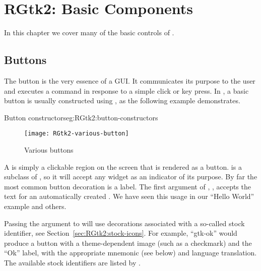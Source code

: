 \chapter{RGtk2: Basic Components}
\label{sec:basic-components}
In this chapter we cover many of the basic controls of \GTK.

\section{Buttons}
\label{sec:RGtk2:gtkButton}

The button is the very essence of a GUI. It communicates its purpose
to the user and executes a command in response to a simple click or
key press. In \GTK\/, a basic button is usually constructed using
, as the following example demonstrates.

\begin{example}{Button constructors}{eg:RGtk2:button-constructors}
\begin{Schunk}
\end{Schunk}
\end{example}

\begin{figure}
  \centering
  \texttt{[image: RGtk2-various-button]}
  \caption{Various buttons}
  \label{fig:RGtk2:various-buttons}
\end{figure}

A  is simply a clickable region on the screen that is
rendered as a button.  is a subclass of
, so it will accept any widget as an indicator of its
purpose. By far the most common button decoration is a label. The
first argument of ,
, accepts the text for an automatically
created . We have seen this usage in our ``Hello
World'' example and others.

Passing the  argument to
 will use decorations associated with a so-called
stock identifier, see Section~\ref{sec:RGtk2:stock-icons}. For
example, ``gtk-ok'' would produce a button with a theme-dependent
image (such as a checkmark) and the ``Ok'' label, with the appropriate
mnemonic (see below) and language translation.  The available stock
identifiers are listed by .

